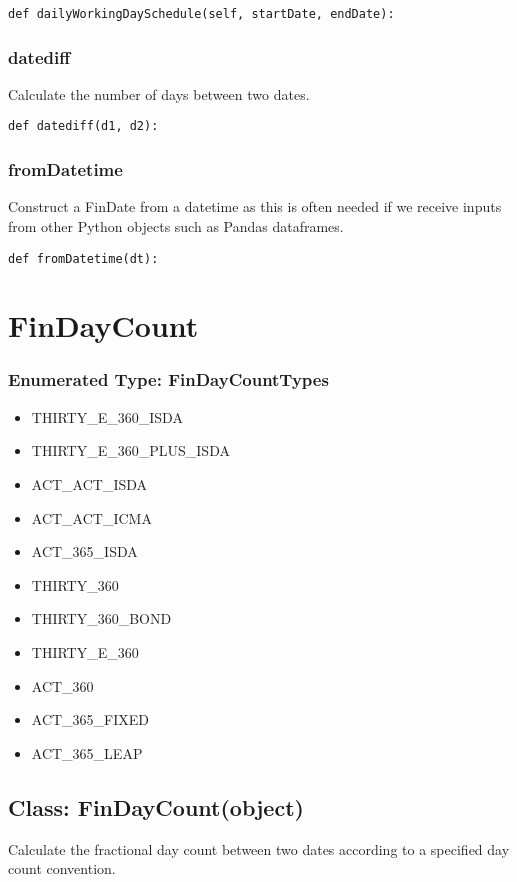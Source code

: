 \documentclass[twoside,11pt]{book}
\begin{document}
\begin{lstlisting}
def dailyWorkingDaySchedule(self, startDate, endDate):
\end{lstlisting}

\subsubsection*{{\bf datediff}}
Calculate the number of days between two dates.  

\begin{lstlisting}
def datediff(d1, d2):
\end{lstlisting}

\subsubsection*{{\bf fromDatetime}}
Construct a FinDate from a datetime as this is often needed if we receive inputs from other Python objects such as Pandas dataframes.  

\begin{lstlisting}
def fromDatetime(dt):
\end{lstlisting}

\newpage
\section{FinDayCount}

\subsubsection{Enumerated Type: FinDayCountTypes}
\begin{itemize}
\item{THIRTY\_E\_360\_ISDA}
\item{THIRTY\_E\_360\_PLUS\_ISDA}
\item{ACT\_ACT\_ISDA}
\item{ACT\_ACT\_ICMA}
\item{ACT\_365\_ISDA}
\item{THIRTY\_360}
\item{THIRTY\_360\_BOND}
\item{THIRTY\_E\_360}
\item{ACT\_360}
\item{ACT\_365\_FIXED}
\item{ACT\_365\_LEAP}
\end{itemize}

\subsection*{Class: FinDayCount(object)}
Calculate the fractional day count between two dates according to a specified day count convention.  
\end{document}
